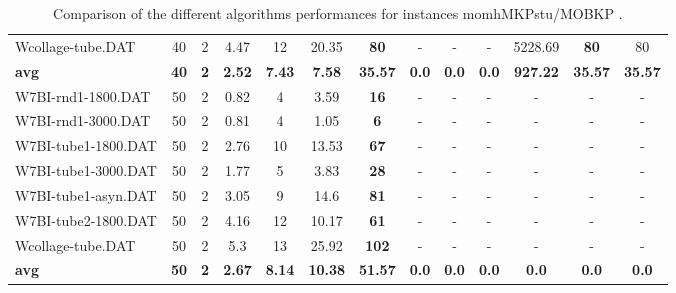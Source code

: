 \begin{table}[h]
{\begin{tabular}{lcccccccccccc}
Wcollage-tube.DAT & 40 & 2 & 4.47 & 12 & 20.35 &  \textbf{80} &  - &  - &  - & 5228.69 &  \textbf{80} & 80 \\
\cline{1-13} \textbf{avg} & \textbf{40} & \textbf{2} & \textbf{2.52} & \textbf{7.43} & \textbf{7.58} & \textbf{35.57} & \textbf{0.0} & \textbf{0.0} & \textbf{0.0} & \textbf{927.22} & \textbf{35.57} & \textbf{35.57} \\ \cline{1-13}
W7BI-rnd1-1800.DAT & 50 & 2 & 0.82 & 4 & 3.59 &  \textbf{16} &  - &  - &  - &  - &  - &  - \\
W7BI-rnd1-3000.DAT & 50 & 2 & 0.81 & 4 & 1.05 &  \textbf{6} &  - &  - &  - &  - &  - &  - \\
W7BI-tube1-1800.DAT & 50 & 2 & 2.76 & 10 & 13.53 &  \textbf{67} &  - &  - &  - &  - &  - &  - \\
W7BI-tube1-3000.DAT & 50 & 2 & 1.77 & 5 & 3.83 &  \textbf{28} &  - &  - &  - &  - &  - &  - \\
W7BI-tube1-asyn.DAT & 50 & 2 & 3.05 & 9 & 14.6 &  \textbf{81} &  - &  - &  - &  - &  - &  - \\
W7BI-tube2-1800.DAT & 50 & 2 & 4.16 & 12 & 10.17 &  \textbf{61} &  - &  - &  - &  - &  - &  - \\
Wcollage-tube.DAT & 50 & 2 & 5.3 & 13 & 25.92 &  \textbf{102} &  - &  - &  - &  - &  - &  - \\
\cline{1-13} \textbf{avg} & \textbf{50} & \textbf{2} & \textbf{2.67} & \textbf{8.14} & \textbf{10.38} & \textbf{51.57} & \textbf{0.0} & \textbf{0.0} & \textbf{0.0} & \textbf{0.0} & \textbf{0.0} & \textbf{0.0} \\ \cline{1-13}
\bottomrule
\end{tabular}
}%
\caption{Comparison of the different algorithms performances for instances momhMKPstu/MOBKP .}
\label{tab:table_compare_momhMKPstu/MOBKP }
\end{table}

